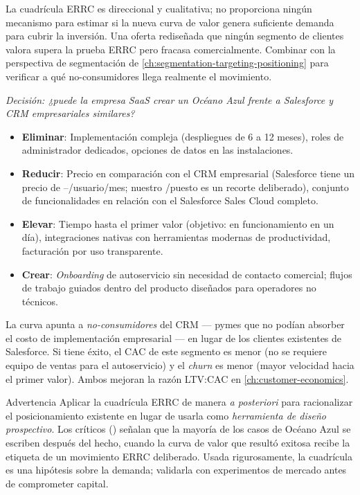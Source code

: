 La cuadrícula ERRC es direccional y cualitativa; no proporciona ningún mecanismo para estimar
si la nueva curva de valor genera suficiente demanda para cubrir la inversión. Una oferta
rediseñada que ningún segmento de clientes valora supera la prueba ERRC pero fracasa
comercialmente. Combinar con la perspectiva de segmentación de \cref{ch:segmentation-targeting-positioning}
para verificar a qué no-consumidores llega realmente el movimiento.

\begin{example}
\emph{Decisión: ¿puede la empresa SaaS crear un Océano Azul frente a Salesforce y CRM
empresariales similares?}

\begin{itemize}
  \item \textbf{Eliminar}: Implementación compleja (despliegues de 6 a 12 meses), roles de
        administrador dedicados, opciones de datos en las instalaciones.
  \item \textbf{Reducir}: Precio en comparación con el CRM empresarial (Salesforce tiene un
        precio de --/usuario/mes; nuestro /puesto es un
        recorte deliberado), conjunto de funcionalidades en relación con el Salesforce Sales
        Cloud completo.
  \item \textbf{Elevar}: Tiempo hasta el primer valor (objetivo: en funcionamiento en un día),
        integraciones nativas con herramientas modernas de productividad, facturación por uso
        transparente.
  \item \textbf{Crear}: \emph{Onboarding} de autoservicio sin necesidad de contacto comercial;
        flujos de trabajo guiados dentro del producto diseñados para operadores no técnicos.
\end{itemize}

La curva apunta a \emph{no-consumidores} del CRM --- pymes que no podían absorber el costo de
implementación empresarial --- en lugar de los clientes existentes de Salesforce. Si tiene
éxito, el CAC de este segmento es menor (no se requiere equipo de ventas para el autoservicio)
y el \emph{churn} es menor (mayor velocidad hacia el primer valor). Ambos mejoran la razón
LTV:CAC en \cref{ch:customer-economics}.
\end{example}

\begin{admonition}{Advertencia}
Aplicar la cuadrícula ERRC de manera \emph{a posteriori} para racionalizar el posicionamiento
existente en lugar de usarla como \emph{herramienta de diseño prospectivo}. Los críticos
(\parencite{dranove7theconomics}) señalan que la mayoría de los casos de Océano Azul se
escriben después del hecho, cuando la curva de valor que resultó exitosa recibe la etiqueta
de un movimiento ERRC deliberado. Usada rigurosamente, la cuadrícula es una hipótesis sobre
la demanda; validarla con experimentos de mercado antes de comprometer capital.
\end{admonition}

